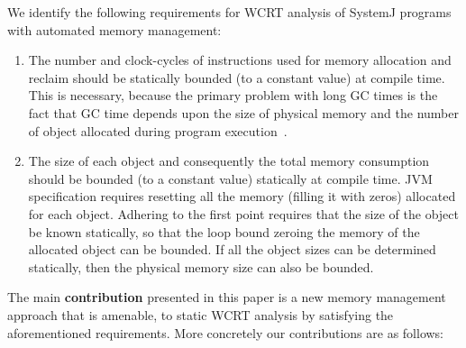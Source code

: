 {\color{red}

  We identify the following requirements for WCRT analysis of SystemJ
  programs with automated memory management:

  \begin{enumerate}

  \item The number and clock-cycles of instructions used for memory
    allocation and reclaim should be statically bounded (to a constant
    value) at compile time. This is necessary, because the primary
    problem with long GC times is the fact that GC time depends upon the
    size of physical memory and the number of object allocated during
    program execution~\cite{schoeberl2010scheduling}.

  \item The size of each object and consequently the total memory
    consumption should be bounded (to a constant value) statically at
    compile time. JVM specification requires resetting all the memory
    (filling it with zeros) allocated for each object. Adhering to the
    first point requires that the size of the object be known
    statically, so that the loop bound zeroing the memory of the
    allocated object can be bounded. If all the object sizes can be
    determined statically, then the physical memory size can also be
    bounded.

  \end{enumerate}

}


The main \textbf{contribution} presented in this paper is a new memory
management approach that is amenable, to static WCRT analysis by
satisfying the aforementioned requirements. More concretely our
contributions are as follows:

